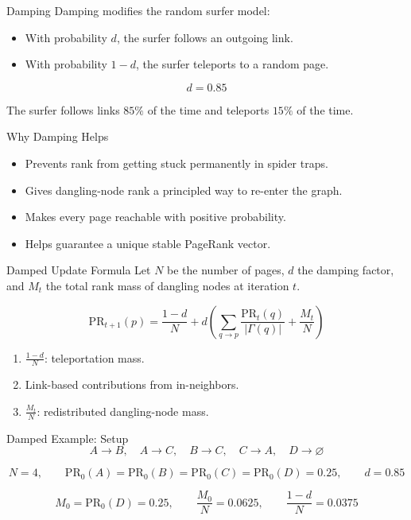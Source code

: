 \documentclass[aspectratio=169,11pt]{beamer}
\newcommand{\PR}{\mathrm{PR}}
\begin{document}
\begin{frame}{Damping}
Damping modifies the random surfer model:
\begin{itemize}
  \item With probability \(d\), the surfer follows an outgoing link.
  \item With probability \(1-d\), the surfer teleports to a random page.
\end{itemize}

\[
d=0.85
\]

The surfer follows links \(85\%\) of the time and teleports \(15\%\) of the time.
\end{frame}

\begin{frame}{Why Damping Helps}
\begin{itemize}
  \item Prevents rank from getting stuck permanently in spider traps.
  \item Gives dangling-node rank a principled way to re-enter the graph.
  \item Makes every page reachable with positive probability.
  \item Helps guarantee a unique stable PageRank vector.
\end{itemize}
\end{frame}

\begin{frame}{Damped Update Formula}
Let \(N\) be the number of pages, \(d\) the damping factor, and \(M_t\) the total
rank mass of dangling nodes at iteration \(t\).

\[
\PR_{t+1}(p)
=
\frac{1-d}{N}
+
d \left(
\sum_{q \rightarrow p}
\frac{\PR_t(q)}{|\Gamma(q)|}
+
\frac{M_t}{N}
\right)
\]

\begin{enumerate}
  \item \(\frac{1-d}{N}\): teleportation mass.
  \item Link-based contributions from in-neighbors.
  \item \(\frac{M_t}{N}\): redistributed dangling-node mass.
\end{enumerate}
\end{frame}

\begin{frame}{Damped Example: Setup}
\[
A \rightarrow B,\quad A \rightarrow C,\quad B \rightarrow C,\quad C \rightarrow A,
\quad D \rightarrow \varnothing
\]

\[
N=4,\qquad
\PR_0(A)=\PR_0(B)=\PR_0(C)=\PR_0(D)=0.25,\qquad
d=0.85
\]

\[
M_0=\PR_0(D)=0.25,
\qquad
\frac{M_0}{N}=0.0625,
\qquad
\frac{1-d}{N}=0.0375
\]
\end{frame}
\end{document}
